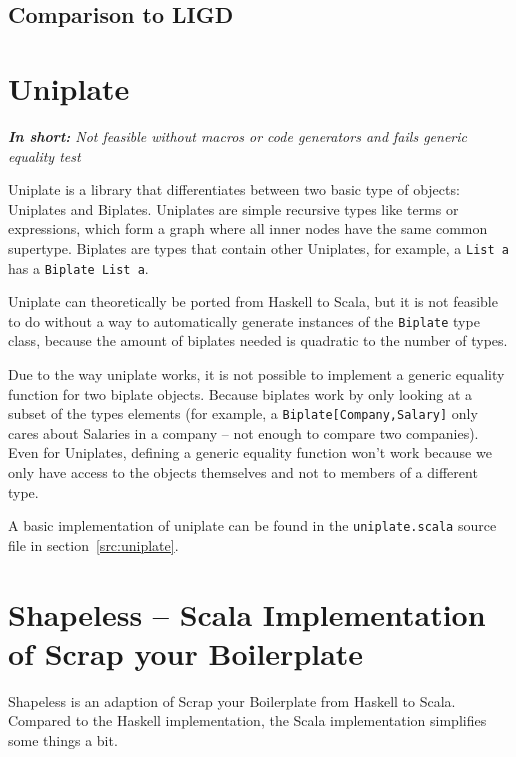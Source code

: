 \documentclass[abstracton,parskip=half]{scrreprt}
\newcommand{\cd}{\texttt}
\newcommand{\summary}[1]{\textit{\textbf{In short:} #1}}
\begin{document}
    \subsection{Comparison to LIGD}


    \clearpage
    \section{Uniplate}
    \summary{Not feasible without macros or code generators and fails generic equality test}

    Uniplate is a library that differentiates between two basic type of
    objects: Uniplates and Biplates. Uniplates are simple recursive types
    like terms or expressions, which form a graph where all inner nodes have
    the same common supertype. Biplates are types that contain other Uniplates,
    for example, a \cd{List a} has a \cd{Biplate List a}.


    Uniplate can theoretically be ported from Haskell to Scala, but it is not
    feasible to do without a way to automatically generate instances of the
    \cd{Biplate} type class, because the amount of biplates needed is quadratic
    to the number of types.

    Due to the way uniplate works, it is not possible to implement a generic
    equality function for two biplate objects. Because biplates work by only
    looking at a subset of the types elements (for example, a \cd{Biplate[Company,Salary]}
    only cares about Salaries in a company -- not enough to compare two companies). Even
    for Uniplates, defining a generic equality function won't work because we
    only have access to the objects themselves and not to members of a different
    type.

    A basic implementation of uniplate can be found in the \cd{uniplate.scala}
    source file in section~\ref{src:uniplate}.


    \section{Shapeless -- Scala Implementation of Scrap your Boilerplate}

    Shapeless is an adaption of Scrap your Boilerplate\cite{DBLP:conf/tldi/LammelJ03}
    from Haskell to Scala. Compared to the Haskell implementation, the Scala
    implementation simplifies some things a bit.
\end{document}
